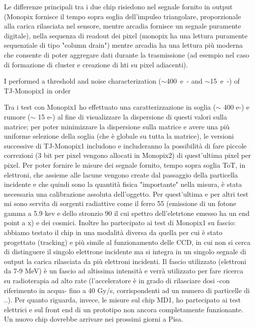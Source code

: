 Le differenze principali tra i due chip risiedono nel segnale fornito in output (Monopix fornisce il tempo sopra soglia dell'impulso triangolare, proporzionale alla carica rilasciata nel sensore, mentre arcadia fornisce un segnale puramente digitale), nella sequenza di readout dei pixel (monopix ha una lettura puramente sequenziale di tipo "column drain") mentre arcadia ha una lettura più moderna che consente di poter aggregare dati durante la trasmissione (ad esempio nel caso di formazione di cluster e creazione di hti su pixel adiacenti). 

I performed a threshold and noise characterization ($\sim$\SI{400}{e-} and $\sim$\SI{15}{e-}) of TJ-Monopix1 in order 

Tra i test con Monopix1 ho effettuato una caratterizzazione in soglia ($\sim$ 400 e-) e rumore ($\sim$ 15 e-) al fine di visualizzare la dispersione di questi valori sulla matrice; per poter minimizzare la dispersione sulla matrice e avere una più uniforme selezione della soglia (che è globale su tutta la matrice), le versioni successive di TJ-Monopix1 includono e includeranno la possibilità di fare piccole correzioni (3 bit per pixel vengono allocati in Monopix2) di quest'ultima pixel per pixel. 
Per poter fornire le misure dei segnale fornito, tempo sopra soglia ToT, in elettroni, che assieme alle lacune vengono create dal passaggio della particella incidente e che quindi sono la quantità fisica "importante" nella misura, è stata necessaria una calibrazione assoluta dell'oggetto. Per quest'ultima e per altri test  mi sono servita di sorgenti radiattive come il ferro 55 (emissione di un fotone gamma a 5.9 kev e dello stronzio 90 il cui spettro dell'eletrtone emesso ha un end point a x) e dei cosmici. 
Inoltre ho partecipato ai test di Monopix1 su fascio: abbiamo testato il chip in una modalità diversa da quella per cui è stato progettato (tracking) e più simile al funzionamento delle CCD, in cui non si cerca di distinguere il singolo elettrone incidente ma si integra in un singolo segnale di output la carica rilasciata da più elettroni incidenti. Il fascio utilizzato (elettroni da 7-9 MeV) è un fascio ad altissima intensità e verrà utilizzato per fare ricerca su radioterapia ad alto rate (l'acceleratore è in grado di rilasciare dosi -con riferimento in acqua- fino a 40 Gy/s, corrispondenti ad un numero di particelle di ..).
Per quanto riguarda, invece, le misure sul chip MD1, ho partecipato ai test elettrici e sul front end di un prototipo non ancora completamente funzionante. Un nuovo chip dovrebbe arrivare nei prossimi giorni a Pisa. 







